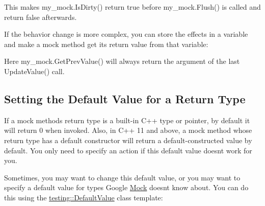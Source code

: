 This makes {\ttfamily my\+\_\+mock.\+Is\+Dirty()} return {\ttfamily true} before {\ttfamily my\+\_\+mock.\+Flush()} is called and return {\ttfamily false} afterwards.

If the behavior change is more complex, you can store the effects in a variable and make a mock method get its return value from that variable\+:


\begin{DoxyCode}{0}
\DoxyCodeLine{}
\end{DoxyCode}


Here {\ttfamily my\+\_\+mock.\+Get\+Prev\+Value()} will always return the argument of the last {\ttfamily Update\+Value()} call.

\subsection*{Setting the Default Value for a Return Type}

If a mock method\textquotesingle{}s return type is a built-\/in C++ type or pointer, by default it will return 0 when invoked. Also, in C++ 11 and above, a mock method whose return type has a default constructor will return a default-\/constructed value by default. You only need to specify an action if this default value doesn\textquotesingle{}t work for you.

Sometimes, you may want to change this default value, or you may want to specify a default value for types Google \mbox{\hyperlink{classMock}{Mock}} doesn\textquotesingle{}t know about. You can do this using the {\ttfamily \mbox{\hyperlink{classtesting_1_1DefaultValue}{testing\+::\+Default\+Value}}} class template\+:


\begin{DoxyCode}{0}
\DoxyCodeLine{\};}
\DoxyCodeLine{}
\DoxyCodeLine{}
\DoxyCodeLine{}
\DoxyCodeLine{}
\DoxyCodeLine{}
\end{DoxyCode}


